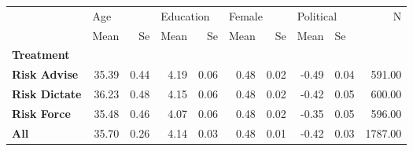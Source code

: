 \begin{tabular}{lrrrrrrrrr}
\toprule
{} & \multicolumn{2}{l}{Age} & \multicolumn{2}{l}{Education} & \multicolumn{2}{l}{Female} & \multicolumn{2}{l}{Political} &       N \\
{} &  Mean &   Se &      Mean &   Se &   Mean &   Se &      Mean & \multicolumn{2}{l}{Se} \\
\textbf{Treatment   } &       &      &           &      &        &      &           &      &         \\
\midrule
\textbf{Risk Advise } & 35.39 & 0.44 &      4.19 & 0.06 &   0.48 & 0.02 &     -0.49 & 0.04 &  591.00 \\
\textbf{Risk Dictate} & 36.23 & 0.48 &      4.15 & 0.06 &   0.48 & 0.02 &     -0.42 & 0.05 &  600.00 \\
\textbf{Risk Force  } & 35.48 & 0.46 &      4.07 & 0.06 &   0.48 & 0.02 &     -0.35 & 0.05 &  596.00 \\
\textbf{All         } & 35.70 & 0.26 &      4.14 & 0.03 &   0.48 & 0.01 &     -0.42 & 0.03 & 1787.00 \\
\bottomrule
\end{tabular}
